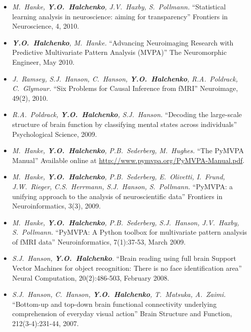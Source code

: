 \documentclass[12pt,overlapped,line]{res}
\newcommand{\mtitle}[1]{``#1''}
\newcommand{\mauthors}[1]{ \textit{#1.}}
\newcommand{\mwhere}[1]{#1.}
\begin{document}
\begin{resume}
\begin{itemize}
 \item
   \mauthors{M.~Hanke, \textbf{Y.O.~Halchenko}, J.V.~Haxby, S.~Pollmann}
   \mtitle{Statistical learning analysis in neuroscience: aiming for
     transparency}
   \mwhere{Frontiers in Neuroscience, 4, 2010}

 \item
   \mauthors{\textbf{Y.O.~Halchenko}, M.~Hanke}
    \mtitle{Advancing Neuroimaging Research with Predictive Multivariate
      Pattern Analysis (MVPA)}
    \mwhere{The Neuromorphic Engineer, May 2010}

 \item
   \mauthors{J.~Ramsey, S.J.~Hanson, C.~Hanson, \textbf{Y.O.~Halchenko},
     R.A.~Poldrack, C.~Glymour}
   \mtitle{Six Problems for Causal Inference from fMRI}
   \mwhere{Neuroimage, 49(2), 2010}

 \item
   \mauthors{R.A.~Poldrack, \textbf{Y.O.~Halchenko}, S.J.~Hanson}
   \mtitle{Decoding the large-scale structure of brain function by
     classifying mental states across individuals}
   \mwhere{Psychological Science, 2009}

  \item
    \mauthors{M.~Hanke, \textbf{Y.O.~Halchenko}, P.B.~Sederberg, M.~Hughes}
    \mtitle{The PyMVPA Manual}
    \mwhere{\newline Available online at \url{http://www.pymvpa.org/PyMVPA-Manual.pdf}}

 \item
   \mauthors{M.~Hanke, \textbf{Y.O.~Halchenko}, P.B.~Sederberg, E.~Olivetti, I.~Frund, J.W.~Rieger, C.S.~Herrmann, S.J.~Hanson, S.~Pollmann}
    \mtitle{PyMVPA: a unifying approach to the analysis of neuroscientific data}
    \mwhere{Frontiers in Neuroinformatics, 3(3), 2009}

  \item
    \mauthors{M.~Hanke, \textbf{Y.O.~Halchenko}, P.B.~Sederberg, S.J.~Hanson, J.V.~Haxby, S.~Pollmann}
    \mtitle{PyMVPA: A Python toolbox for multivariate pattern analysis of fMRI data}
    \mwhere{Neuroinformatics, 7(1):37-53, March 2009}

  \item
    \mauthors{S.J.~Hanson, \textbf{Y.O.~Halchenko}}
    \mtitle{Brain reading using full brain Support Vector Machines for
      object recognition: There is no face identification area}
    \mwhere{Neural Computation, 20(2):486-503, February 2008}

  \item
    \mauthors{S.J.~Hanson, C.~Hanson, \textbf{Y.O.~Halchenko}, T.~Matsuka, A.~Zaimi}
    \mtitle{Bottom-up and top-down brain functional connectivity underlying comprehension of everyday visual action}
    \mwhere{Brain Structure and Function, 212(3-4):231-44, 2007}


\end{itemize}
\end{resume}
\end{document}
